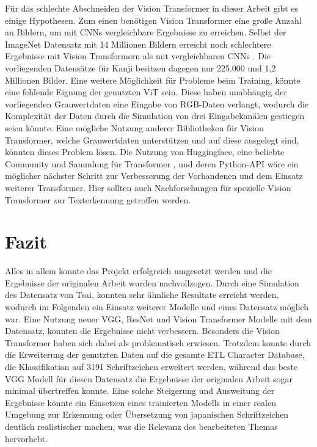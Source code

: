 \documentclass[twoside,a4paper]{IEEEtran}
\begin{document}
Für das schlechte Abschneiden der Vision Transformer in dieser Arbeit gibt es einige Hypothesen. Zum einen benötigen Vision Transformer eine große Anzahl an Bildern, um mit CNNs vergleichbare Ergebnisse zu erreichen. Selbst der ImageNet Datensatz mit 14 Millionen Bildern \cite{IMAGENET} erreicht noch schlechtere Ergebnisse mit Vision Transformern als mit vergleichbaren CNNs \cite{JFT}. Die vorliegenden Datensätze für Kanji besitzen dagegen nur 225.000 und 1,2 Millionen Bilder. Eine weitere Möglichkeit für Probleme beim Training, könnte eine fehlende Eignung der genutzten ViT sein. Diese haben unabhängig der vorliegenden Grauwertdaten eine Eingabe von RGB-Daten verlangt, wodurch die Komplexität der Daten durch die Simulation von drei Eingabekanälen gestiegen seien könnte. Eine mögliche Nutzung anderer Bibliotheken für Vision Transformer, welche Grauwertdaten unterstützen und auf diese ausgelegt sind, könnten dieses Problem lösen. Die Nutzung von Huggingface, eine beliebte Community und Sammlung für Transformer \cite{huggingface}, und deren Python-API wäre ein möglicher nächster Schritt zur Verbesserung der Vorhandenen und dem Einsatz weiterer Transformer. Hier sollten auch Nachforschungen für spezielle Vision Transformer zur Texterkennung getroffen werden. 

\section{Fazit} %
Alles in allem konnte das Projekt erfolgreich umgesetzt werden und die Ergebnisse der originalen Arbeit wurden nachvollzogen. Durch eine Simulation des Datensatz von Tsai, konnten sehr ähnliche Resultate erreicht werden, wodurch im Folgenden ein Einsatz weiterer Modelle und eines Datensatz möglich war. Eine Nutzung neuer VGG, ResNet und Vision Transformer Modelle mit dem Datensatz, konnten die Ergebnisse nicht verbessern. Besonders die Vision Transformer haben sich dabei als problematisch erwiesen. Trotzdem konnte durch die Erweiterung der genutzten Daten auf die gesamte ETL Character Database, die Klassifikation auf 3191 Schriftzeichen erweitert werden, während das beste VGG Modell für diesen Datensatz die Ergebnisse der originalen Arbeit sogar minimal übertreffen konnte. Eine solche Steigerung und Ausweitung der Ergebnisse könnte ein Einsetzen eines trainierten Modells in einer realen Umgebung zur Erkennung oder Übersetzung von japanischen Schriftzeichen deutlich realistischer machen, was die Relevanz des bearbeiteten Themas hervorhebt.
\end{document}
